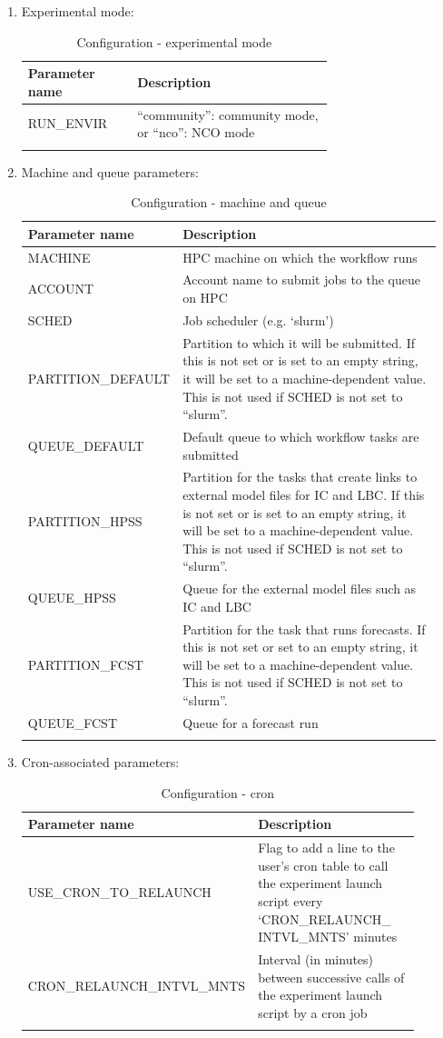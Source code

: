 \documentclass[11pt,fleqn]{report}              %
\begin{document}
\begin{enumerate}
\item Experimental mode:
{
\scriptsize
\begin{longtable}{ p{0.2\linewidth} | p{0.5\linewidth} }
\hline
\hline
Parameter name & Description \\
\hline
RUN\_ENVIR & ``community'': community mode, or ``nco'': NCO mode \\
\hline
\caption{Configuration - experimental mode}
\label{table:config_expmode}
\end{longtable}
}

\item Machine and queue parameters:
{
\scriptsize
\begin{longtable}{ p{0.2\linewidth} | p{0.75\linewidth} }
\hline
\hline
Parameter name & Description \\
\hline
MACHINE & HPC machine on which the workflow runs \\
ACCOUNT & Account name to submit jobs to the queue on HPC  \\
SCHED & Job scheduler (e.g. `slurm') \\
PARTITION\_DEFAULT & Partition to which it will be submitted. If this is not set or is set to an empty string, it will be set to a machine-dependent value. This is not used if SCHED is not set to ``slurm''.\\
QUEUE\_DEFAULT & Default queue to which workflow tasks are submitted \\
PARTITION\_HPSS & Partition for the tasks that create links to external model files for IC and LBC.  If this is not set or is set to an empty string, it will be set to a machine-dependent value. This is not used if SCHED is not set to ``slurm''. \\
QUEUE\_HPSS & Queue for the external model files such as IC and LBC \\
PARTITION\_FCST & Partition for the task that runs forecasts. If this is not set or set to an empty string, it will be set to a machine-dependent value. This is not used if SCHED is not set to ``slurm''. \\
QUEUE\_FCST & Queue for a forecast run \\
\hline
\caption{Configuration - machine and queue}
\label{table:config_queue}
\end{longtable}
}

\item Cron-associated parameters:
{
\scriptsize
\begin{longtable}{p{0.3\linewidth} | p{0.6\linewidth} }
\hline
\hline
Parameter name & Description \\
\hline
USE\_CRON\_TO\_RELAUNCH & Flag to add a line to the user's cron table to call the experiment launch script every `CRON\_RELAUNCH\_ INTVL\_MNTS' minutes \\
CRON\_RELAUNCH\_INTVL\_MNTS & Interval (in minutes) between successive calls of the experiment launch script by a cron job \\
\hline
\caption{Configuration - cron}
\label{table:config_cron}
\end{longtable}
}


\end{enumerate}
\end{document}
